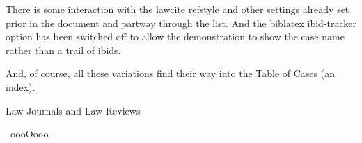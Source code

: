 \newpage
{}
\bigskip

There is some interaction with the lawcite refstyle and other settings already set prior in the document and partway through the list. And the biblatex ibid-tracker option has been switched off to allow the demonstration to show the case name rather than a trail of ibids.

And, of course, all these variations find their way into the Table of Cases (an index).

\newpage
Law Journals and Law Reviews
\bigskip

\bigskip 


\bigskip
\bigskip
\hfill --oooOooo--\hfill\ 

\printbibliography[type=book]







